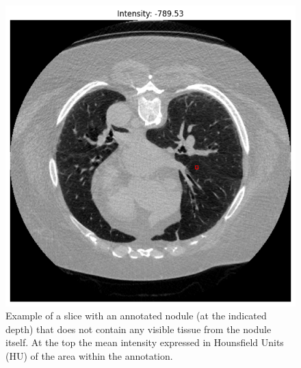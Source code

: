 \begin{figure}[h]
    \centering
    \includegraphics[width=0.6\linewidth]{images/non-visible-nodule-1.png}
    \caption{Example of a slice with an annotated nodule (at the indicated depth) that does not contain any visible tissue from the nodule itself. At the top the mean intensity expressed in Hounsfield Units (HU) of the area within the annotation. }
    \label{fig:non-visible-nodule}
\end{figure}